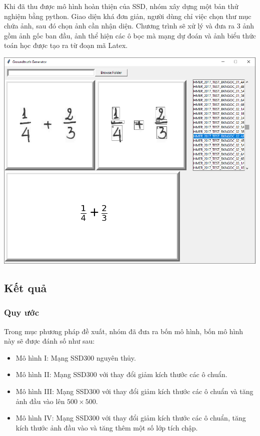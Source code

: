 \documentclass[a4paper,12pt]{article}
\begin{document}
	Khi đã thu được mô hình hoàn thiện của SSD, nhóm xây dựng một bản thử nghiệm bằng python. Giao diện khá đơn giản, người dùng chỉ việc chọn thư mục chứa ảnh, sau đó chọn ảnh cần nhận diện. Chương trình sẽ xử lý và đưa ra 3 ảnh gồm ảnh gốc ban đầu, ảnh thể hiện các ô bọc mà mạng dự đoán và ảnh biểu thức toán học được tạo ra từ đoạn mã Latex.
	
	\begin{center}
		
		\centering
		\includegraphics[width=0.8\linewidth]{demoImg.png}
		\vspace{0.5cm}
	\end{center}
	\subsection{Kết quả}
	\subsubsection{Quy ước}
	
	Trong mục phương pháp đề xuất, nhóm đã đưa ra bốn mô hình, bốn mô hình này sẽ được đánh số như sau:
	\begin{itemize}
		\item Mô hình I: Mạng SSD300 nguyên thủy\cite{liu2016ssd}.
		\item Mô hình II: Mạng SSD300\cite{liu2016ssd} với thay đổi giảm kích thước các ô chuẩn.
		\item Mô hình III: Mạng SSD300\cite{liu2016ssd} với thay đổi giảm kích thước các ô chuẩn và tăng ảnh đầu vào lên $500 \times 500$.
		\item Mô hình IV: Mạng SSD300\cite{liu2016ssd} với thay đổi giảm kích thước các ô chuẩn, tăng kích thước ảnh đầu vào và tăng thêm một số lớp tích chập.
	\end{itemize}
	
\end{document}
